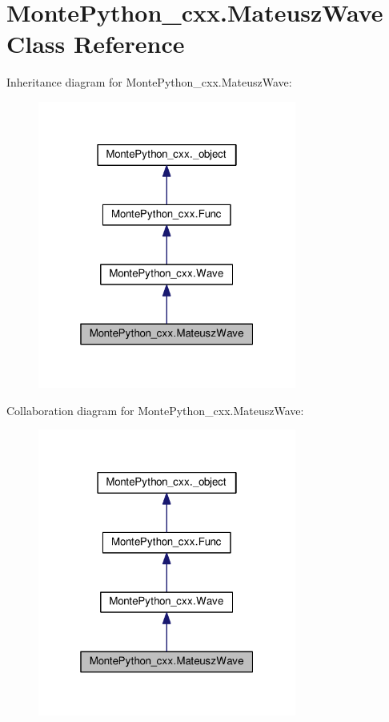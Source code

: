 \hypertarget{classMontePython__cxx_1_1MateuszWave}{}\section{Monte\+Python\+\_\+cxx.\+Mateusz\+Wave Class Reference}
\label{classMontePython__cxx_1_1MateuszWave}


Inheritance diagram for Monte\+Python\+\_\+cxx.\+Mateusz\+Wave\+:
\nopagebreak
\begin{figure}[H]
\begin{center}
\leavevmode
\includegraphics[width=241pt]{classMontePython__cxx_1_1MateuszWave__inherit__graph}
\end{center}
\end{figure}


Collaboration diagram for Monte\+Python\+\_\+cxx.\+Mateusz\+Wave\+:
\nopagebreak
\begin{figure}[H]
\begin{center}
\leavevmode
\includegraphics[width=241pt]{classMontePython__cxx_1_1MateuszWave__coll__graph}
\end{center}
\end{figure}
